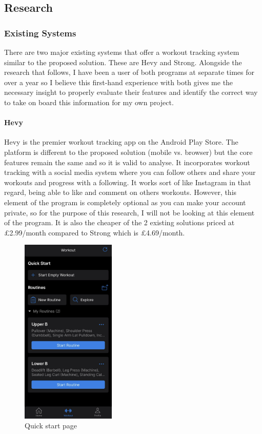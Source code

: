 \documentclass{article}
\begin{document}
\subsection{Research}

\subsubsection{Existing Systems}
There are two major existing systems that offer a workout tracking system similar to the proposed solution. These are Hevy and Strong. Alongside the research that follows, I have been a user of both programs at separate times for over a year so I believe this first-hand experience with both gives me the necessary insight to properly evaluate their features and identify the correct way to take on board this information for my own project. 

\paragraph{Hevy}
Hevy is the premier workout tracking app on the Android Play Store. The platform is different to the proposed solution (mobile vs. browser) but the core features remain the same and so it is valid to analyse. It incorporates workout tracking with a social media system where you can follow others and share your workouts and progress with a following. It works sort of like Instagram in that regard, being able to like and comment on others workouts. However, this element of the program is completely optional as you can make your account private, so for the purpose of this research, I will not be looking at this element of the program. It is also the cheaper of the 2 existing solutions priced at £2.99/month compared to Strong which is £4.69/month. 

\begin{figure}
  \centering
  \includegraphics[width=0.4\textwidth]{Figure 4.png}
  \caption{Quick start page}
\end{figure}
\end{document}
